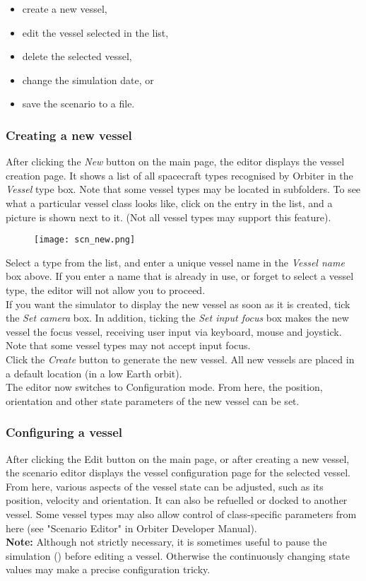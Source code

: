 \documentclass[Orbiter User Manual.tex]{subfiles}
\begin{document}
\begin{itemize}
\item create a new vessel,
\item edit the vessel selected in the list,
\item delete the selected vessel,
\item change the simulation date, or
\item save the scenario to a file.
\end{itemize}


\subsubsection{Creating a new vessel}
After clicking the \textit{New} button on the main page, the editor displays the vessel creation page. It shows a list of all spacecraft types recognised by Orbiter in the \textit{Vessel} type box. Note that some vessel types may be located in subfolders. To see what a particular vessel class looks like, click on the entry in the list, and a picture is shown next to it. (Not all vessel types may support this feature).

\begin{figure}[H]
	\centering
	\texttt{[image: scn\_new.png]}
\end{figure}

\noindent
Select a type from the list, and enter a unique vessel name in the \textit{Vessel name} box above. If you enter a name that is already in use, or forget to select a vessel type, the editor will not allow you to proceed.\\
If you want the simulator to display the new vessel as soon as it is created, tick the \textit{Set camera} box. In addition, ticking the \textit{Set input focus} box makes the new vessel the focus vessel, receiving user input via keyboard, mouse and joystick. Note that some vessel types may not accept input focus.\\
Click the \textit{Create} button to generate the new vessel. All new vessels are placed in a default location (in a low Earth orbit).\\
The editor now switches to Configuration mode. From here, the position, orientation and other state parameters of the new vessel can be set.


\subsubsection{Configuring a vessel}
After clicking the Edit button on the main page, or after creating a new vessel, the scenario editor displays the vessel configuration page for the selected vessel. From here, various aspects of the vessel state can be adjusted, such as its position, velocity and orientation. It can also be refuelled or docked to another vessel. Some vessel types may also allow control of class-specific parameters from here (see "Scenario Editor" in Orbiter Developer Manual).\\
\textbf{Note:} Although not strictly necessary, it is sometimes useful to pause the simulation (\Ctrl{}) before editing a vessel. Otherwise the continuously changing state values may make a precise configuration tricky.
\end{document}
